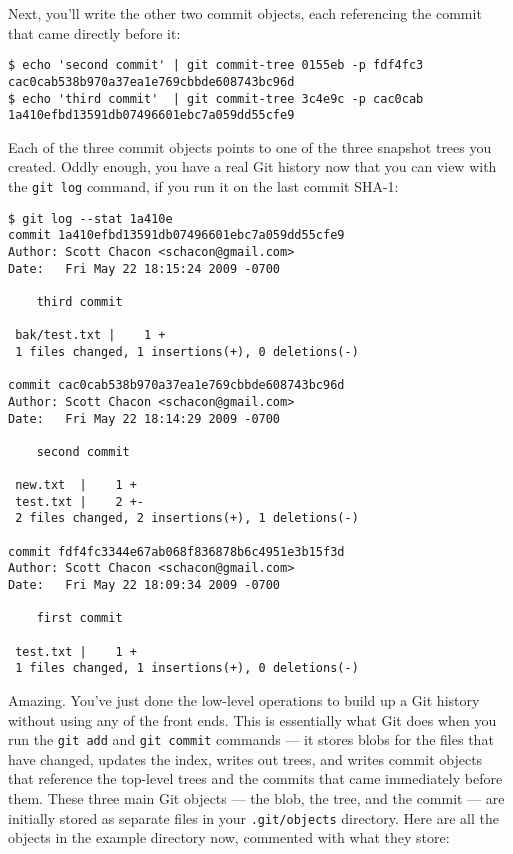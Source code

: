 \documentclass[a4paper]{book}
\begin{document}
Next, you'll write the other two commit objects, each referencing the commit that came directly before it:

\begin{shaded}\begin{verbatim}
$ echo 'second commit' | git commit-tree 0155eb -p fdf4fc3
cac0cab538b970a37ea1e769cbbde608743bc96d
$ echo 'third commit'  | git commit-tree 3c4e9c -p cac0cab
1a410efbd13591db07496601ebc7a059dd55cfe9
\end{verbatim}\end{shaded}

Each of the three commit objects points to one of the three snapshot trees you created. Oddly enough, you have a real Git history now that you can view with the \texttt{git log} command, if you run it on the last commit SHA-1:

\begin{shaded}\begin{verbatim}
$ git log --stat 1a410e
commit 1a410efbd13591db07496601ebc7a059dd55cfe9
Author: Scott Chacon <schacon@gmail.com>
Date:   Fri May 22 18:15:24 2009 -0700

    third commit

 bak/test.txt |    1 +
 1 files changed, 1 insertions(+), 0 deletions(-)

commit cac0cab538b970a37ea1e769cbbde608743bc96d
Author: Scott Chacon <schacon@gmail.com>
Date:   Fri May 22 18:14:29 2009 -0700

    second commit

 new.txt  |    1 +
 test.txt |    2 +-
 2 files changed, 2 insertions(+), 1 deletions(-)

commit fdf4fc3344e67ab068f836878b6c4951e3b15f3d
Author: Scott Chacon <schacon@gmail.com>
Date:   Fri May 22 18:09:34 2009 -0700

    first commit

 test.txt |    1 +
 1 files changed, 1 insertions(+), 0 deletions(-)
\end{verbatim}\end{shaded}

Amazing. You've just done the low-level operations to build up a Git history without using any of the front ends. This is essentially what Git does when you run the \texttt{git add} and \texttt{git commit} commands --- it stores blobs for the files that have changed, updates the index, writes out trees, and writes commit objects that reference the top-level trees and the commits that came immediately before them. These three main Git objects --- the blob, the tree, and the commit --- are initially stored as separate files in your \texttt{.git/objects} directory. Here are all the objects in the example directory now, commented with what they store:
\end{document}
